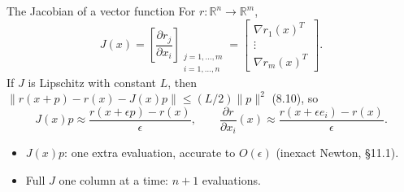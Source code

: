 \documentclass[12pt,aspectratio=169]{beamer}
\newcommand{\eps}{\epsilon}
\newcommand{\R}{\mathbb{R}}
\begin{document}
\begin{frame}{The Jacobian of a vector function}
  For $r:\R^n\to\R^m$,
  \begin{equation}
    J(x) = \left[\frac{\partial r_j}{\partial x_i}\right]_{\substack{j=1,\dots,m\\ i=1,\dots,n}}
    = \begin{bmatrix} \nabla r_1(x)^T\\ \vdots\\ \nabla r_m(x)^T \end{bmatrix}. \tag{8.9}
  \end{equation}
  If $J$ is Lipschitz with constant $L$, then
  $\|r(x+p)-r(x)-J(x)p\|\le (L/2)\|p\|^2$ (8.10), so
  \begin{equation}
    J(x)p\approx\frac{r(x+\eps p)-r(x)}{\eps}, \qquad
    \frac{\partial r}{\partial x_i}(x)\approx\frac{r(x+\eps e_i)-r(x)}{\eps}. \tag{8.11, 8.12}
  \end{equation}
  \begin{itemize}
    \item $J(x)p$: \alert{one extra evaluation}, accurate to $O(\eps)$ (inexact Newton, \S11.1).
    \item Full $J$ one column at a time: $n+1$ evaluations.
  \end{itemize}
\end{frame}
\end{document}
